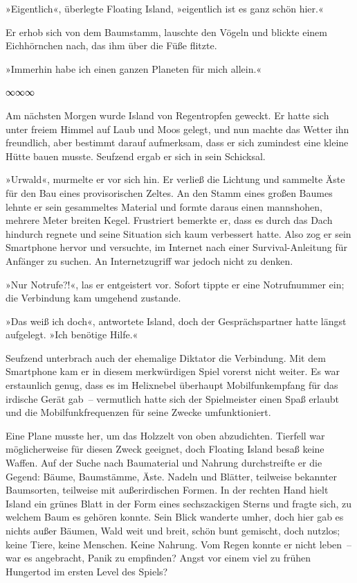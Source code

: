»Eigentlich«, überlegte Floating Island, »eigentlich ist es ganz schön hier.«

Er erhob sich von dem Baumstamm, lauschte den Vögeln und blickte einem Eichhörnchen nach, das ihm über die Füße flitzte.

»Immerhin habe ich einen ganzen Planeten für mich allein.«

\begin{center}
∞∞∞
\end{center}

Am nächsten Morgen wurde Island von Regentropfen geweckt. Er hatte sich unter freiem Himmel auf Laub und Moos gelegt, und nun machte das Wetter ihn freundlich, aber bestimmt darauf aufmerksam, dass er sich zumindest eine kleine Hütte bauen musste. Seufzend ergab er sich in sein Schicksal.

»Urwald«, murmelte er vor sich hin. Er verließ die Lichtung und sammelte Äste für den Bau eines provisorischen Zeltes. An den Stamm eines großen Baumes lehnte er sein gesammeltes Material und formte daraus einen mannshohen, mehrere Meter breiten Kegel. Frustriert bemerkte er, dass es durch das Dach hindurch regnete und seine Situation sich kaum verbessert hatte. Also zog er sein Smartphone hervor und versuchte, im Internet nach einer Survival-Anleitung für Anfänger zu suchen. An Internetzugriff war jedoch nicht zu denken.

»Nur Notrufe?!«, las er entgeistert vor. Sofort tippte er eine Notrufnummer ein; die Verbindung kam umgehend zustande.


»Das weiß ich doch«, antwortete Island, doch der Gesprächspartner hatte längst aufgelegt. »Ich benötige Hilfe.«

Seufzend unterbrach auch der ehemalige Diktator die Verbindung. Mit dem Smartphone kam er in diesem merkwürdigen Spiel vorerst nicht weiter. Es war erstaunlich genug, dass es im Helixnebel überhaupt Mobilfunkempfang für das irdische Gerät gab~– vermutlich hatte sich der Spielmeister einen Spaß erlaubt und die Mobilfunkfrequenzen für seine Zwecke umfunktioniert.

Eine Plane musste her, um das Holzzelt von oben abzudichten. Tierfell war möglicherweise für diesen Zweck geeignet, doch Floating Island besaß keine Waffen. Auf der Suche nach Baumaterial und Nahrung durchstreifte er die Gegend: Bäume, Baumstämme, Äste. Nadeln und Blätter, teilweise bekannter Baumsorten, teilweise mit außerirdischen Formen. In der rechten Hand hielt Island ein grünes Blatt in der Form eines sechszackigen Sterns und fragte sich, zu welchem Baum es gehören konnte. Sein Blick wanderte umher, doch hier gab es nichts außer Bäumen, Wald weit und breit, schön bunt gemischt, doch nutzlos; keine Tiere, keine Menschen. Keine Nahrung. Vom Regen konnte er nicht leben~– war es angebracht, Panik zu empfinden? Angst vor einem viel zu frühen Hungertod im ersten Level des Spiels?

